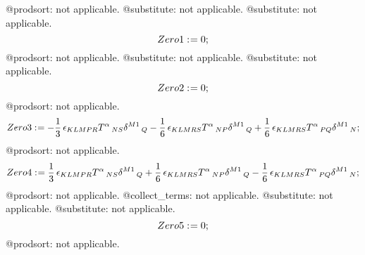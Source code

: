 \documentclass[11pt]{article}
\def\specialcolon{\mathrel{\mathop{:}}\hspace{-.5em}}
\begin{document}
@prodsort: not applicable.
@substitute: not applicable.
@substitute: not applicable.
\begin{dmath*}[compact, spread=2pt]
Zero1\specialcolon{}= 0;
\end{dmath*}
@prodsort: not applicable.
@substitute: not applicable.
@substitute: not applicable.
\begin{dmath*}[compact, spread=2pt]
Zero2\specialcolon{}= 0;
\end{dmath*}
@prodsort: not applicable.
\begin{dmath*}[compact, spread=2pt]
Zero3\specialcolon{}=  - \frac{1}{3}\, {\epsilon}_{K L M P R} {T}^{\alpha}\,_{N S} {\delta}^{M1}\,_{Q} - \frac{1}{6}\, {\epsilon}_{K L M R S} {T}^{\alpha}\,_{N P} {\delta}^{M1}\,_{Q} + \frac{1}{6}\, {\epsilon}_{K L M R S} {T}^{\alpha}\,_{P Q} {\delta}^{M1}\,_{N};
\end{dmath*}
@prodsort: not applicable.
\begin{dmath*}[compact, spread=2pt]
Zero4\specialcolon{}= \frac{1}{3}\, {\epsilon}_{K L M P R} {T}^{\alpha}\,_{N S} {\delta}^{M1}\,_{Q} + \frac{1}{6}\, {\epsilon}_{K L M R S} {T}^{\alpha}\,_{N P} {\delta}^{M1}\,_{Q} - \frac{1}{6}\, {\epsilon}_{K L M R S} {T}^{\alpha}\,_{P Q} {\delta}^{M1}\,_{N};
\end{dmath*}
@prodsort: not applicable.
@collect\_terms: not applicable.
@substitute: not applicable.
@substitute: not applicable.
\begin{dmath*}[compact, spread=2pt]
Zero5\specialcolon{}= 0;
\end{dmath*}
@prodsort: not applicable.
\end{document}
